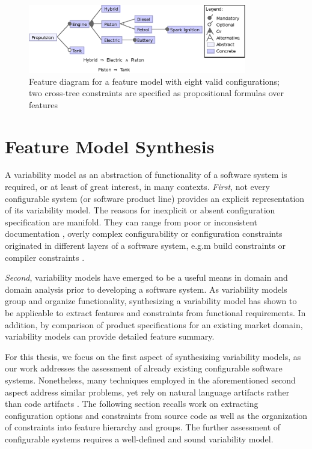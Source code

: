 {\begin{figure}[htbp]
  \centering
  
  	\includegraphics[width=0.85\textwidth]{images/introduction_fm.eps}
  \caption{Feature diagram for a feature model with eight valid configurations;
  two cross-tree constraints are specified as propositional formulas over
  features}
  \label{fig:introduction_fm}
\end{figure}}

\section{Feature Model Synthesis}  \label{sec:2.3}
A variability model as an abstraction of functionality of a software system is
required, or at least of great interest, in many contexts. \emph{First}, not
every configurable system (or software product line) provides an explicit
representation of its variability model. 
The reasons for inexplicit or absent configuration specification are manifold.
They can range from poor or inconsistent documentation
\citep{rabkin_static_2011}, overly complex configurability \citep{xu_hey_2015}
or configuration constraints originated in different layers of a software
system, e.g.m build constraints  or compiler constraints \citep{nadi_where_2015}. 

\emph{Second}, variability models have emerged to be a useful means in domain
and domain analysis prior to developing a software system. As variability
models group and organize functionality, synthesizing a variability model has
shown to be applicable to extract features and constraints from functional
requirements. In addition, by comparison of product specifications for an
existing market domain, variability models can provide detailed feature summary.

For this thesis, we focus on the first aspect of synthesizing variability
models, as our work addresses the assessment of already existing configurable
software systems. Nonetheless, many techniques employed in the aforementioned
second aspect address similar problems, yet rely on natural language artifacts
rather than code artifacts \citep{alves_exploratory_2008,bakar_feature_2015}.
The following section recalls work on extracting configuration options and
constraints from source code as well as the organization of constraints into
feature hierarchy and groups. The further assessment of configurable systems
requires a well-defined and sound variability model.


